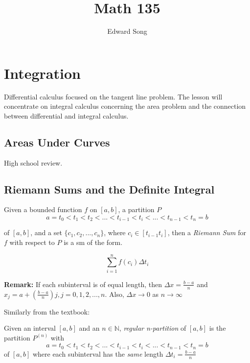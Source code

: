 \documentclass[11pt]{article}
\title{Math 135}
\author{Edward Song}
\theoremstyle{plain}
\theoremstyle{remark}
\theoremstyle{plain}
\newcommand{\bd}{\textbf}
\newcommand{\nn}{\mathbb{N}}
\begin{document}
\section {Integration}


\begin{tcolorbox}[colback=red!5!white,colframe=red!75!black,title=Recall]
    Differential calculus focused on the tangent line problem. The lesson will
    concentrate on integral calculus concerning the area problem and the connection 
    between differential and integral calculus.
\end{tcolorbox}   

\subsection{Areas Under Curves}
High school review.

\subsection{Riemann Sums and the Definite Integral}

\begin{tcolorbox}[colback=green!5!white,colframe=green!75!black,title=Riemann Sum in Textbook]
    Given a bounded function $f$ on $[a,b]$, a partition $P$
    \[a = t_0 < t_1 < t_2 < ... < t_{i-1} < t_i < ... < t_{n-1} < t_n = b\]

    of $[a,b]$, and a set $\{c_1, c_2, ... , c_n\}$, where $c_i \in [t_{i-1} t_i]$, then a \emph{Riemann Sum} for $f$
    with respect to $P$ is a sm of the form.

    \[ \sum_{i=1}^{n} f(c_i)\Delta t_i \]
\end{tcolorbox}   

\bd{Remark:} If each subinterval is of equal length, then $\Delta x = \frac{b-a}{n}$ and $x_j = a + (\frac{b-a}{n})j, j=0,1,2,...,n$. Also, $\Delta x \to 0$ as $n\to \infty$

Similarly from the textbook:
\begin{tcolorbox}[colback=green!5!white,colframe=green!75!black,title=Regular n-Partition]
    Given an interval $[a,b]$ and an $n\in \nn$, \emph{regular n-partition} of $[a,b]$ is the partition $P^{(n)}$ with
    \[a = t_0 < t_1 < t_2 < ... < t_{i-1} < t_i < ... < t_{n-1} < t_n = b\]
    of $[a,b]$ where each subinterval has the \emph{same} length $\Delta t_i = \frac{b-a}{n}$
\end{tcolorbox}   
\end{document}
